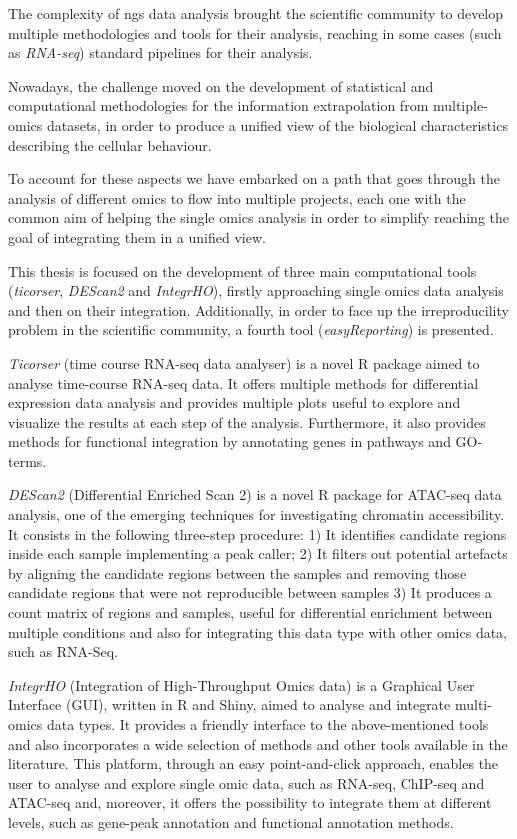 The complexity of \gls{ngs} data analysis brought the scientific community to develop multiple methodologies and tools for their analysis, reaching in some cases (such as \textit{RNA-seq}) standard pipelines for their analysis.

Nowadays, the challenge moved on the development of statistical and computational methodologies for the information extrapolation from multiple-omics datasets, in order to produce a unified view of the biological characteristics describing the cellular behaviour.

To account for these aspects we have embarked on a path that goes through the analysis of different omics to flow into multiple projects, each one with the common aim of helping the single omics analysis in order to simplify reaching the goal of integrating them in a unified view.

This thesis is focused on the development of three main computational tools (\textit{ticorser}, \textit{DEScan2} and \textit{IntegrHO}), firstly approaching single omics data analysis and then on their integration.
Additionally, in order to face up the irreproducility problem in the scientific community, a fourth tool (\textit{easyReporting}) is presented.

\textit{Ticorser} (time course RNA-seq data analyser) is a novel R package aimed to analyse time-course RNA-seq data. It offers multiple methods for differential expression data analysis and provides multiple plots useful to explore and visualize the results at each step of the analysis. Furthermore, it also provides methods for functional integration by annotating genes in pathways and GO-terms.

\textit{DEScan2} (Differential Enriched Scan 2) is a novel R package for ATAC-seq data analysis, one of the emerging techniques for investigating chromatin accessibility. It consists in the following three-step procedure: 1) It identifies candidate regions inside each sample implementing a peak caller; 2) It filters out potential artefacts by aligning the candidate regions between the samples and removing those candidate regions that were not reproducible between samples 3) It produces a count matrix of regions and samples, useful for differential enrichment between multiple conditions and also for integrating this data type with other omics data, such as RNA-Seq.

\textit{IntegrHO} (Integration of High-Throughput Omics data) is a Graphical User Interface (GUI), written in R and Shiny, aimed to analyse and integrate multi-omics data types. It provides a friendly interface to the above-mentioned tools and also incorporates a wide selection of methods and other tools available in the literature. This platform, through an easy point-and-click approach, enables the user to analyse and explore single omic data, such as RNA-seq, ChIP-seq and ATAC-seq and, moreover, it offers the possibility to integrate them at different levels, such as gene-peak annotation and functional annotation methods.

